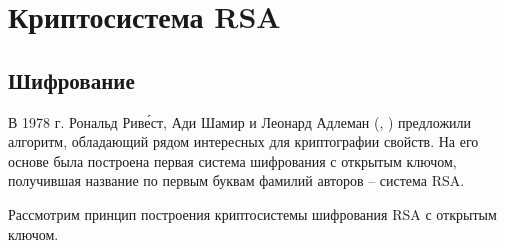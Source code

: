 \section{Криптосистема RSA}

\subsection{Шифрование}

В 1978 г. Рональд Рив\'{е}ст, Ади Шамир и Леонард Адлеман (, \cite{RSA:1978}) предложили алгоритм, обладающий рядом интересных для криптографии свойств. На его основе была построена первая система шифрования с открытым ключом, получившая название по первым буквам фамилий авторов -- система RSA.

Рассмотрим принцип построения криптосистемы шифрования RSA с открытым ключом.

